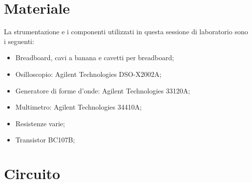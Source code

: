 \section*{Materiale}

La strumentazione e i componenti utilizzati in questa sessione di laboratorio sono i seguenti:

\begin{itemize}
    \setlength{\itemsep}{0pt}
    \item{Breadboard, cavi a banana e cavetti per breadboard;}
    \item{Osilloscopio: Agilent Technologies DSO-X2002A;}
    \item{Generatore di forme d'onde: Agilent Technologies 33120A;}
    \item{Multimetro: Agilent Technologies 34410A;}
    \item{Resistenze varie;}
    \item{Transistor BC107B;}
\end{itemize}

\section*{Circuito}
